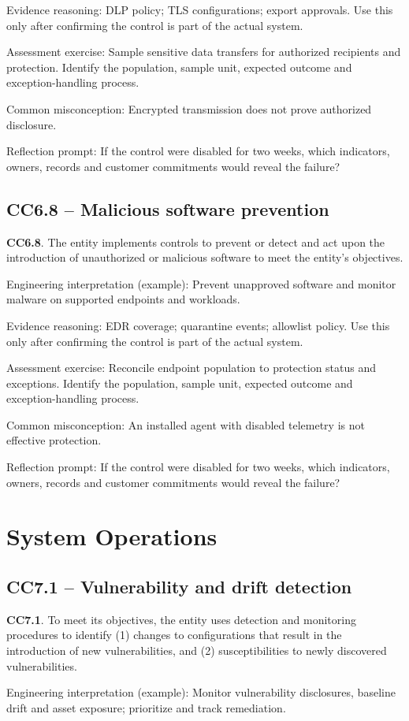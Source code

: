 \documentclass[10pt,oneside]{report}
\begin{document}
Evidence reasoning: DLP policy; TLS configurations; export approvals. Use this only after confirming the control is part of the actual system.

Assessment exercise: Sample sensitive data transfers for authorized recipients and protection. Identify the population, sample unit, expected outcome and exception-handling process.

Common misconception: Encrypted transmission does not prove authorized disclosure.

Reflection prompt: If the control were disabled for two weeks, which indicators, owners, records and customer commitments would reveal the failure?

\subsection{CC6.8 -- Malicious software prevention}
\begin{aicpabox}
\textbf{CC6.8}. The entity implements controls to prevent or detect and act upon the introduction of unauthorized or malicious software to meet the entity's objectives.\par{}
\end{aicpabox}
Engineering interpretation (example): Prevent unapproved software and monitor malware on supported endpoints and workloads.

Evidence reasoning: EDR coverage; quarantine events; allowlist policy. Use this only after confirming the control is part of the actual system.

Assessment exercise: Reconcile endpoint population to protection status and exceptions. Identify the population, sample unit, expected outcome and exception-handling process.

Common misconception: An installed agent with disabled telemetry is not effective protection.

Reflection prompt: If the control were disabled for two weeks, which indicators, owners, records and customer commitments would reveal the failure?

\section{System Operations}
\subsection{CC7.1 -- Vulnerability and drift detection}
\begin{aicpabox}
\textbf{CC7.1}. To meet its objectives, the entity uses detection and monitoring procedures to identify (1) changes to configurations that result in the introduction of new vulnerabilities, and (2) susceptibilities to newly discovered vulnerabilities.\par{}
\end{aicpabox}
Engineering interpretation (example): Monitor vulnerability disclosures, baseline drift and asset exposure; prioritize and track remediation.
\end{document}

